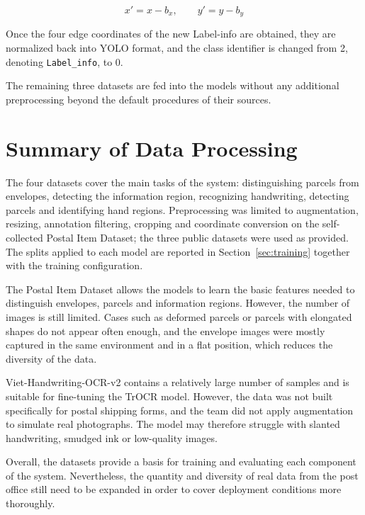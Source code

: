 \begin{equation}
\label{eq:coordshift}
x' = x - b_x, \qquad y' = y - b_y
\end{equation}

Once the four edge coordinates of the new Label-info are obtained, they are normalized back into YOLO format, and the class identifier is changed from 2, denoting \texttt{Label\_info}, to 0.

The remaining three datasets are fed into the models without any additional preprocessing beyond the default procedures of their sources.

\section{Summary of Data Processing}

The four datasets cover the main tasks of the system: distinguishing parcels from envelopes, detecting the information region, recognizing handwriting, detecting parcels and identifying hand regions. Preprocessing was limited to augmentation, resizing, annotation filtering, cropping and coordinate conversion on the self-collected Postal Item Dataset; the three public datasets were used as provided. The splits applied to each model are reported in Section~\ref{sec:training} together with the training configuration.

The Postal Item Dataset allows the models to learn the basic features needed to distinguish envelopes, parcels and information regions. However, the number of images is still limited. Cases such as deformed parcels or parcels with elongated shapes do not appear often enough, and the envelope images were mostly captured in the same environment and in a flat position, which reduces the diversity of the data.

Viet-Handwriting-OCR-v2 contains a relatively large number of samples and is suitable for fine-tuning the TrOCR model. However, the data was not built specifically for postal shipping forms, and the team did not apply augmentation to simulate real photographs. The model may therefore struggle with slanted handwriting, smudged ink or low-quality images.

Overall, the datasets provide a basis for training and evaluating each component of the system. Nevertheless, the quantity and diversity of real data from the post office still need to be expanded in order to cover deployment conditions more thoroughly.

